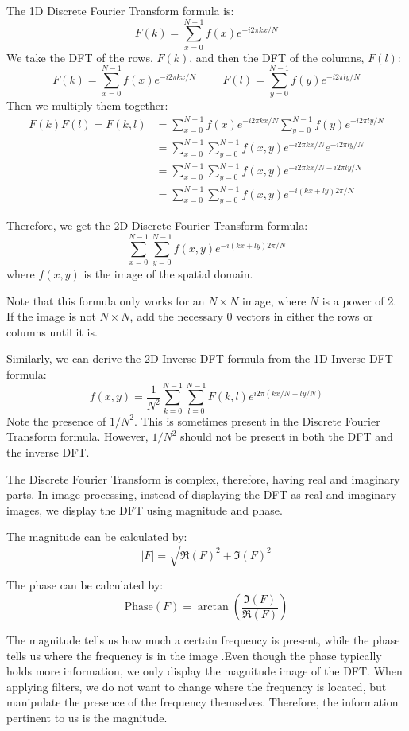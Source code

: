 \documentclass [../article.tex]{subfiles}
\begin{document}
  The 1D Discrete Fourier Transform formula is:
  \[ F(k) = \sum_{x=0}^{N-1}f(x)e^{-i2\pi kx/N} \]
  We take the DFT of the rows, $F(k)$, and then the DFT of the
  columns, $F(l)$:
  \[F(k) = \sum_{x=0}^{N-1}f(x)e^{-i2\pi kx/N}
    \phantom{space}
    F(l) = \sum_{y=0}^{N-1}f(y)e^{-i2\pi ly/N}\]
  Then we multiply them together:
  \begin{align*}
    F(k)F(l) = F(k,l) &=
    \sum_{x=0}^{N-1}f(x)e^{-i2\pi kx/N}
    \sum_{y=0}^{N-1}f(y)e^{-i2\pi ly/N}\\
    {} &= \sum_{x=0}^{N-1}\sum_{y=0}^{N-1}f(x,y)
    e^{-i2\pi kx/N}e^{-i2\pi ly/N}\\
    {} &= \sum_{x=0}^{N-1}\sum_{y=0}^{N-1}f(x,y)
    e^{-i2\pi kx/N - i2\pi ly/N}\\
    {} &= \sum_{x=0}^{N-1}\sum_{y=0}^{N-1}f(x,y)
    e^{-i(kx+ly)2\pi/N }
  \end{align*}

  Therefore, we get the 2D Discrete Fourier
  Transform formula:
  \[\sum_{x=0}^{N-1}\sum_{y=0}^{N-1}f(x,y)e^{-i(kx+ly)2\pi/N}\]
  where $f(x,y)$ is the image of the spatial domain.

  Note that this formula only works for an $N \times N$ image,
  where $N$ is a power of 2. If the image is not $N \times N$,
  add the necessary 0 vectors in either the rows or columns
  until it is.

  Similarly, we can derive the 2D Inverse DFT formula from the
  1D Inverse DFT formula:
  \[f(x,y) = \frac{1}{N^2}\sum_{k=0}^{N-1}\sum_{l=0}^{N-1}
    F(k,l)e^{i2\pi(kx/N+ly/N)}\]
  Note the presence of $1/N^2$. This is sometimes present
  in the Discrete Fourier Transform formula. However,
  $1/N^2$ should not be present in both the DFT and the
  inverse DFT.

  The Discrete Fourier Transform is complex, therefore, having
  real and imaginary parts.  In image processing, instead of
  displaying the DFT as real and imaginary images, we display
  the DFT using magnitude and phase.

  The magnitude can be calculated by:
  \[|F| = \sqrt{\Re(F)^2 + \Im(F)^2}\]

  The phase can be calculated by:
  \[\text{Phase}(F) = \arctan\left(
  \frac{\Im (F)}{\Re (F)}\right)\]

  The magnitude tells us how much a certain frequency is present,
  while the phase tells us where the frequency is in the image
  \cite{brayer}.Even though the phase typically holds more
  information, we only display the magnitude image of the DFT.
  When applying filters, we do not want to change where the
  frequency is located, but manipulate the presence of the
  frequency themselves.  Therefore, the information pertinent
  to us is the magnitude.
\end{document}
